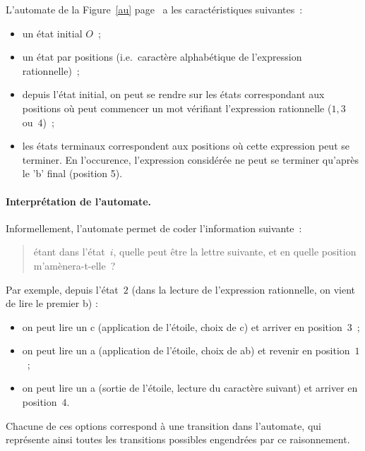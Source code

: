 L'automate de la Figure~\ref{au} page~\pageref{au}  a les caract{\'e}ristiques suivantes~: 
\begin{itemize}
\item un {\'e}tat initial $O$~;
\item un {\'e}tat par positions (i.e.\ caract{\`e}re alphab{\'e}tique de l'expression
  rationnelle)~;
\item depuis l'{\'e}tat initial, on peut se rendre sur les {\'e}tats
  correspondant aux positions o{\`u} peut commencer un mot
  v{\'e}rifiant l'expression rationnelle ($1, 3$ ou~$4$)~;
\item les {\'e}tats terminaux correspondent aux positions o{\`u} cette
  expression peut se terminer. En l'occurence, l'expression
  consid{\'e}r{\'e}e ne peut se terminer qu'apr{\`e}s le 'b' final
  (position 5).
\end{itemize}
\paragraph{Interpr\'etation de l'automate.}
Informellement, l'automate permet de coder l'information suivante~: 
\begin{quote}
\'etant  dans l'{\'e}tat~$i$, quelle peut {\^e}tre la lettre suivante, et en quelle position m'am{\`e}nera-t-elle~? 
\end{quote}
Par exemple, depuis l'{\'e}tat~$2$ (dans la lecture de l'expression rationnelle, on vient de lire le premier b) : 
\begin{itemize}
\item on peut lire un c (application de l'{\'e}toile, choix de c) et arriver en position~$3$~;
\item on peut lire un a (application de l'{\'e}toile, choix de ab) et revenir en position~$1$~; 
\item on peut lire un a (sortie de l'{\'e}toile, lecture du caract{\`e}re suivant) et arriver en position~$4$. 
\end{itemize}
Chacune de ces options correspond {\`a} une transition dans l'automate, qui repr{\'e}sente ainsi toutes les transitions possibles engendr{\'e}es par ce raisonnement.
